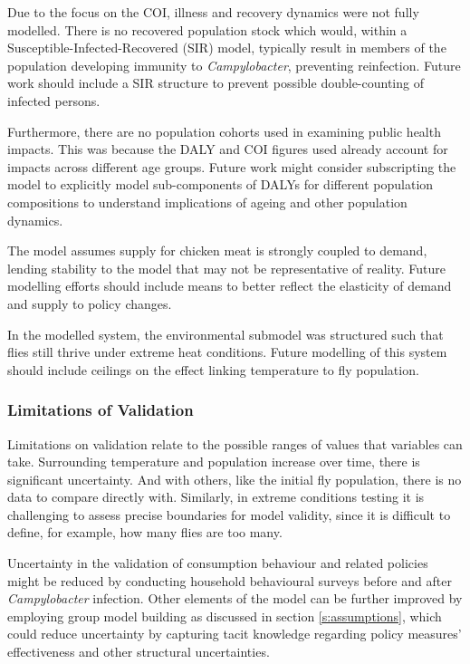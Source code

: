 Due to the focus on the COI, illness and recovery dynamics were not fully modelled. There is no recovered population stock which would, within a Susceptible-Infected-Recovered (SIR) model, typically result in members of the population developing immunity to \textit{Campylobacter}, preventing reinfection. Future work should include a SIR structure to prevent possible double-counting of infected persons.

Furthermore, there are no population cohorts used in examining public health impacts. This was because the DALY and COI figures used already account for impacts across different age groups. Future work might consider subscripting the model to explicitly model sub-components of DALYs for different population compositions to understand implications of ageing and other population dynamics.

The model assumes supply for chicken meat is strongly coupled to demand, lending stability to the model that may not be representative of reality. Future modelling efforts should include means to better reflect the elasticity of demand and supply to policy changes.

In the modelled system, the environmental submodel was structured such that flies still thrive under extreme heat conditions. Future modelling of this system should include ceilings on the effect linking temperature to fly population.

\subsubsection{Limitations of Validation}
Limitations on validation relate to the possible ranges of values that variables can take. Surrounding temperature and population increase over time, there is significant uncertainty. And with others, like the initial fly population, there is no data to compare directly with. Similarly, in extreme conditions testing it is challenging to assess precise boundaries for model validity, since it is difficult to define, for example, how many flies are too many.

Uncertainty in the validation of consumption behaviour and related policies might be reduced by conducting household behavioural surveys before and after \textit{Campylobacter} infection. Other elements of the model can be further improved by employing group model building as discussed in section \ref{s:assumptions}, which could reduce uncertainty by capturing tacit knowledge regarding policy measures' effectiveness and other structural uncertainties.


